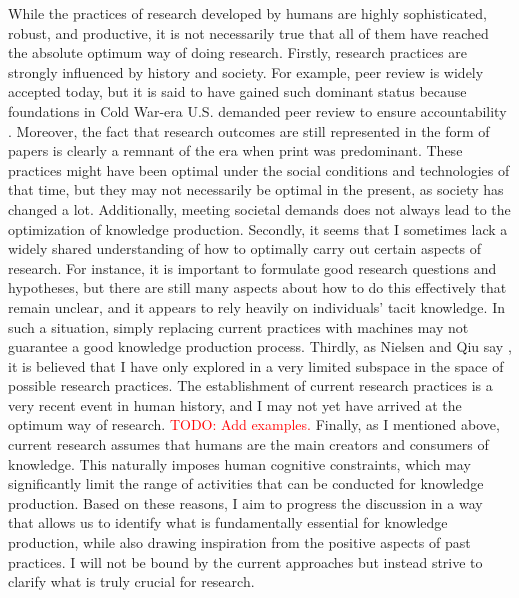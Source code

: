 \documentclass{article}
\begin{document}
While the practices of research developed by humans are highly sophisticated, robust, and productive, it is not necessarily true that all of them have reached the absolute optimum way of doing research. Firstly, research practices are strongly influenced by history and society. For example, peer review is widely accepted today, but it is said to have gained such dominant status because foundations in Cold War-era U.S. demanded peer review to ensure accountability \cite{baldwin2018scientific}. Moreover, the fact that research outcomes are still represented in the form of papers is clearly a remnant of the era when print was predominant. These practices might have been optimal under the social conditions and technologies of that time, but they may not necessarily be optimal in the present, as society has changed a lot. Additionally, meeting societal demands does not always lead to the optimization of knowledge production. Secondly, it seems that I sometimes lack a widely shared understanding of how to optimally carry out certain aspects of research. For instance, it is important to formulate good research questions and hypotheses, but there are still many aspects about how to do this effectively that remain unclear, and it appears to rely heavily on individuals' tacit knowledge. In such a situation, simply replacing current practices with machines may not guarantee a good knowledge production process. Thirdly, as Nielsen and Qiu say \cite{nielsen}, it is believed that I have only explored in a very limited subspace in the space of possible research practices. The establishment of current research practices is a very recent event in human history, and I may not yet have arrived at the optimum way of research. \textcolor{red}{TODO: Add examples.} Finally, as I mentioned above, current research assumes that humans are the main creators and consumers of knowledge. This naturally imposes human cognitive constraints, which may significantly limit the range of activities that can be conducted for knowledge production. Based on these reasons, I aim to progress the discussion in a way that allows us to identify what is fundamentally essential for knowledge production, while also drawing inspiration from the positive aspects of past practices. I will not be bound by the current approaches but instead strive to clarify what is truly crucial for research.
\end{document}
